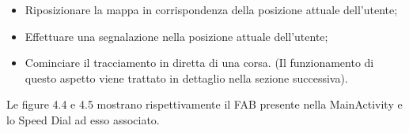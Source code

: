                     \begin{itemize}
                        \item Riposizionare la mappa in corrispondenza della posizione attuale dell'utente;
                        \item Effettuare una segnalazione nella posizione attuale dell'utente;
                        \item Cominciare il tracciamento in diretta di una corsa. (Il funzionamento di questo aspetto viene trattato in dettaglio nella sezione successiva).
                    \end{itemize}

                    Le figure 4.4 e 4.5 mostrano rispettivamente il FAB presente nella MainActivity e lo Speed Dial ad esso associato.
                    \\
                    \\
